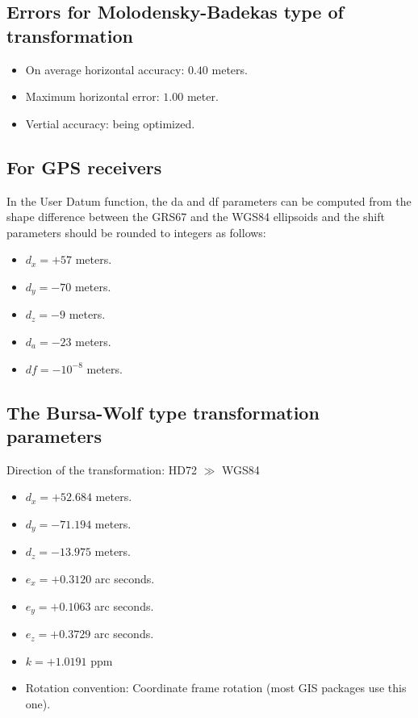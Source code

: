 \documentclass[10pt]{article}
\begin{document}
	\subsection{Errors for Molodensky-Badekas type of transformation}
	\begin{itemize}
		\item On average horizontal accuracy: $0.40$ meters.
		\item Maximum horizontal error: $1.00$ meter.
		\item Vertial accuracy: being optimized.
	\end{itemize}
	
	\subsection{For GPS receivers}
	In the User Datum function, the da and df parameters can be computed from the shape difference between
	the GRS67 and the WGS84 ellipsoids and the shift parameters should be rounded to integers as follows:
	\begin{itemize}
		\item $d_x = +57$ meters.
		\item $d_y = -70$ meters.
		\item $d_z = -9$ meters.
		\item $d_a = -23$ meters.
		\item $df = -10^{-8}$ meters.
	\end{itemize}
	
	\subsection{The Bursa-Wolf type transformation parameters}
	Direction of the transformation: HD72 $\gg$ WGS84 \\
	\begin{itemize}
		\item $d_x = +52.684$ meters.
		\item $d_y = -71.194$ meters.
		\item $d_z = -13.975$ meters.
		\item $e_x = +0.3120$ arc seconds.
		\item $e_y = +0.1063$ arc seconds.
		\item $e_z = +0.3729$ arc seconds.
		\item $k = +1.0191$ ppm
		\item Rotation convention: Coordinate frame rotation (most GIS packages use this one).
	\end{itemize}
	
\end{document}
